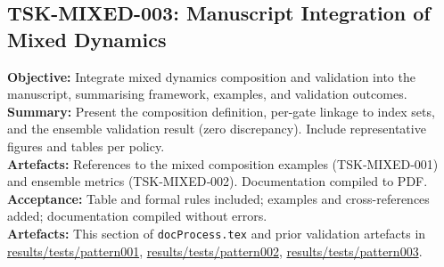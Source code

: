 \documentclass[11pt]{article}
\begin{document}
\subsection{TSK-MIXED-003: Manuscript Integration of Mixed Dynamics}
\textbf{Objective:} Integrate mixed dynamics composition and validation into the manuscript, summarising framework, examples, and validation outcomes.\\
\textbf{Summary:} Present the composition definition, per-gate linkage to index sets, and the ensemble validation result (zero discrepancy). Include representative figures and tables per policy.\\
\textbf{Artefacts:} References to the mixed composition examples (TSK‑MIXED‑001) and ensemble metrics (TSK‑MIXED‑002). Documentation compiled to PDF.
\textbf{Acceptance:} Table and formal rules included; examples and cross-references added; documentation compiled without errors.\\
\textbf{Artefacts:} This section of \texttt{docProcess.tex} and prior validation artefacts in \url{results/tests/pattern001}, \url{results/tests/pattern002}, \url{results/tests/pattern003}.
\end{document}

